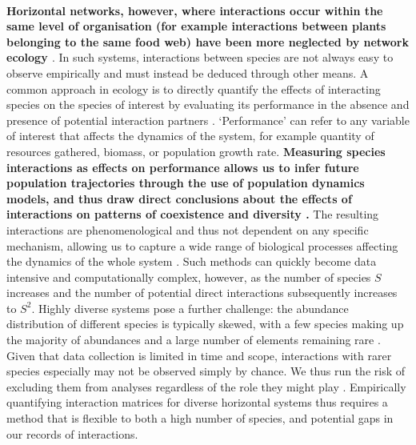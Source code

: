 \documentclass[a4,12pt]{article}
\begin{document}
\begin{refsection}
    \paragraph{} 
    \textbf{Horizontal networks, however, where interactions occur within the same level of organisation (for example interactions between plants belonging to the same food web) have been more neglected by network ecology \parencite{Ellison2019}}. In such systems, interactions between species are not always easy to observe empirically and must instead be deduced through other means. A common approach in ecology is to directly quantify the effects of interacting species on the species of interest by evaluating its performance in the absence and presence of potential interaction partners \parencite{Connell1961, Grace1990}. `Performance' can refer to any variable of interest that affects the dynamics of the system, for example quantity of resources gathered, biomass, or population growth rate. \textbf{Measuring species interactions as effects on performance allows us to infer future population trajectories through the use of population dynamics models, and thus draw direct conclusions about the effects of interactions on patterns of coexistence and diversity \parencite{Laska1998}.} The resulting interactions are phenomenological and thus not dependent on any specific mechanism, allowing us to capture a wide range of biological processes affecting the dynamics of the whole system \parencite{Novak2010}. Such methods can quickly become data intensive and computationally complex, however, as the number of species $S$ increases and the number of potential direct interactions subsequently increases to $S^2$. Highly diverse systems pose a further challenge: the abundance distribution of different species is typically skewed, with a few species making up the majority of abundances and a large number of elements remaining rare \parencite{Fisher1943}. Given that data collection is limited in time and scope, interactions with rarer species especially may not be observed simply by chance. We thus run the risk of excluding them from analyses regardless of the role they might play \parencite{Olesen2011}. Empirically quantifying interaction matrices for diverse horizontal systems thus requires a method that is flexible to both a high number of species, and potential gaps in our records of interactions. 


\end{refsection}
\end{document}
